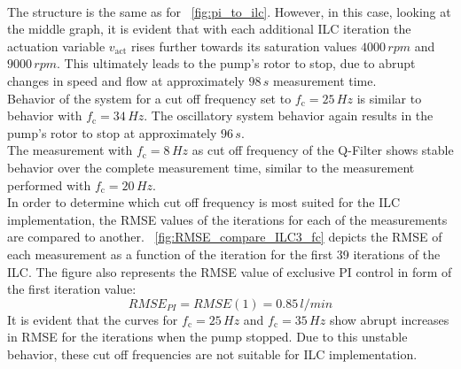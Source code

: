 \\The structure is the same as for \figurename~\ref{fig:pi_to_ilc}. However, in this case, looking at the middle graph, it is evident that with each additional ILC iteration the actuation variable $v_{\mathrm{act}}$ rises further towards its saturation values $4000\,rpm$ and $9000\,rpm$. This ultimately leads to the pump's rotor to stop, due to abrupt changes in speed and flow at approximately $98\,s$ measurement time.
\\Behavior of the system for a cut off frequency set to $f_{\mathrm{c}}=25\,Hz$ is similar to behavior with $f_{\mathrm{c}}=34\,Hz$. The oscillatory system behavior again results in the pump's rotor to stop at approximately $96\,s$.
\\The measurement with $f_{\mathrm{c}}=8\,Hz$ as cut off frequency of the Q-Filter shows stable behavior over the complete measurement time, similar to the measurement performed with $f_{\mathrm{c}}=20\,Hz$.
\\In order to determine which cut off frequency is most suited for the ILC implementation, the RMSE values of the iterations for each of the measurements are compared to another. \figurename~\ref{fig:RMSE_compare_ILC3_fc} depicts the RMSE of each measurement as a function of the iteration for the first 39 iterations of the ILC. The figure also represents the RMSE value of exclusive PI control in form of the first iteration value:
\begin{equation}
  RMSE_{PI}=RMSE(1)= 0.85\,l/min
\end{equation}
It is evident that the curves for $f_{\mathrm{c}}=25\,Hz$ and $f_{\mathrm{c}}=35\,Hz$ show abrupt increases in RMSE for the iterations when the pump stopped. Due to this unstable behavior, these cut off frequencies are not suitable for ILC implementation.
